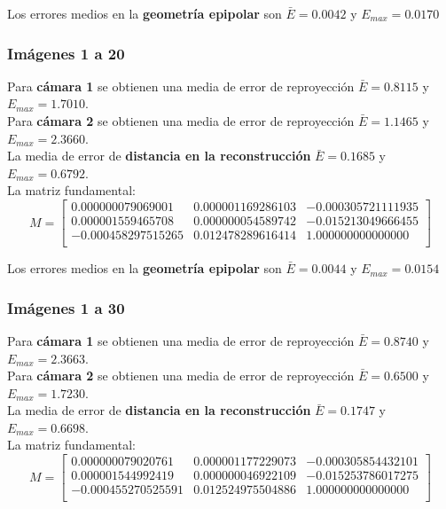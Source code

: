 \documentclass[a4paper, fontsize=11pt]{scrartcl} %
\numberwithin{equation}{section} %
\numberwithin{figure}{section} %
\numberwithin{table}{section} %
\begin{document}
	Los errores medios en la \textbf{geometría epipolar} son $\bar{E} = 0.0042$ y $E_{max} = 0.0170$
	
	\subsubsection*{Imágenes 1 a 20}
	
	Para \textbf{cámara 1} se obtienen una media de error de reproyección $\bar{E} = 0.8115$ y $E_{max} = 1.7010$.\\
	Para \textbf{cámara 2} se obtienen una media de error de reproyección $\bar{E} = 1.1465$ y $E_{max} = 2.3660$.\\
	
	La media de error de \textbf{distancia en la reconstrucción} $\bar{E} = 0.1685$ y $E_{max} = 0.6792$.\\
	La matriz fundamental:
	\[
	M=
	\begin{bmatrix}
	0.000000079069001&	0.000001169286103&	-0.000305721111935 \\
	0.000001559465708&	0.000000054589742&	-0.015213049666455 \\
	-0.000458297515265&	0.012478289616414&	1.000000000000000  \\
	
	\end{bmatrix}
	\]
	
	Los errores medios en la \textbf{geometría epipolar} son $\bar{E} = 0.0044$ y $E_{max} = 0.0154$
	
	\subsubsection*{Imágenes 1 a 30}
	
	Para \textbf{cámara 1} se obtienen una media de error de reproyección $\bar{E} = 0.8740$ y $E_{max} = 2.3663$.\\
	Para \textbf{cámara 2} se obtienen una media de error de reproyección $\bar{E} = 0.6500$ y $E_{max} = 1.7230$.\\
	
	La media de error de \textbf{distancia en la reconstrucción} $\bar{E} = 0.1747$ y $E_{max} = 0.6698$.\\
	La matriz fundamental:
	\[
	M=
	\begin{bmatrix}
	0.000000079020761&	0.000001177229073&	-0.000305854432101 \\
	0.000001544992419&	0.000000046922109&	-0.015253786017275 \\
	-0.000455270525591&	0.012524975504886&	1.000000000000000  \\
	
	\end{bmatrix}
	\]
	
\end{document}
